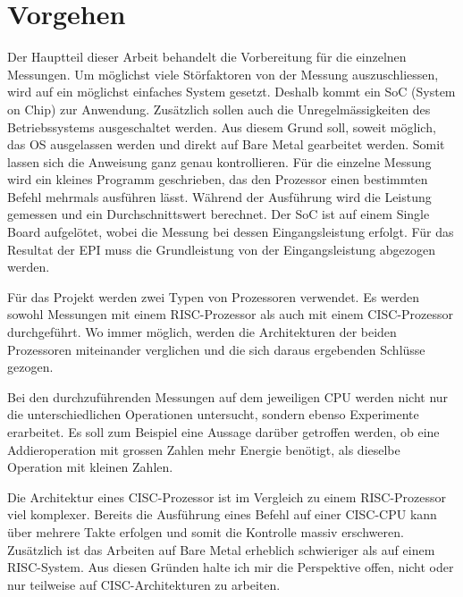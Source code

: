 \chapter{Vorgehen}

Der Hauptteil dieser Arbeit behandelt die Vorbereitung für die einzelnen Messungen. Um möglichst viele Störfaktoren
von der Messung auszuschliessen, wird auf ein möglichst einfaches System gesetzt. Deshalb kommt ein SoC
(System on Chip) zur Anwendung. Zusätzlich sollen auch die Unregelmässigkeiten des Betriebssystems ausgeschaltet
werden. Aus diesem Grund soll, soweit möglich, das OS ausgelassen werden und direkt auf Bare Metal gearbeitet werden.
Somit lassen sich die Anweisung ganz genau kontrollieren. Für die einzelne Messung wird ein kleines Programm geschrieben,
das den Prozessor einen bestimmten Befehl mehrmals ausführen lässt. Während der Ausführung wird die Leistung gemessen und
ein Durchschnittswert berechnet. Der SoC ist auf einem Single Board aufgelötet, wobei
die Messung bei dessen Eingangsleistung erfolgt. Für das Resultat der EPI muss die Grundleistung von der Eingangsleistung abgezogen
werden.
\par
Für das Projekt werden zwei Typen von Prozessoren verwendet. Es werden sowohl Messungen mit einem RISC-Prozessor
als auch mit einem CISC-Prozessor durchgeführt. Wo immer möglich, werden die Architekturen der beiden Prozessoren miteinander verglichen
und die sich daraus ergebenden Schlüsse gezogen.
\par
Bei den durchzuführenden Messungen auf dem jeweiligen CPU werden nicht nur die unterschiedlichen Operationen untersucht, sondern ebenso 
Experimente erarbeitet. Es soll zum Beispiel eine Aussage darüber getroffen werden, ob eine Addieroperation
mit grossen Zahlen mehr Energie benötigt, als dieselbe Operation mit kleinen Zahlen.
\par
Die Architektur eines CISC-Prozessor ist im Vergleich zu einem RISC-Prozessor viel komplexer. Bereits die Ausführung eines Befehl
auf einer CISC-CPU kann über mehrere Takte erfolgen und somit die Kontrolle massiv erschweren. Zusätzlich ist das Arbeiten auf Bare
Metal erheblich schwieriger als auf einem RISC-System. Aus diesen Gründen halte ich mir die Perspektive offen,
nicht oder nur teilweise auf CISC-Architekturen zu arbeiten. 

